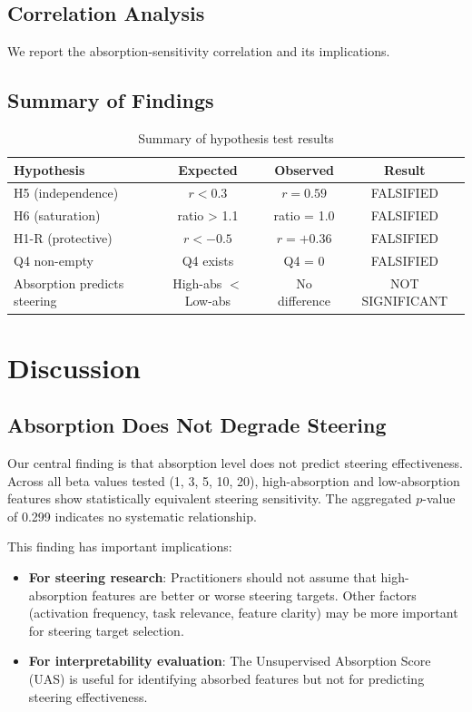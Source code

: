 \documentclass{article}
\begin{document}
\subsection{Correlation Analysis}

We report the absorption-sensitivity correlation and its implications.

\subsection{Summary of Findings}

\begin{table}[htbp]
\caption{Summary of hypothesis test results}
\label{tab:summary}
\centering
\begin{tabular}{lccc}
\toprule
Hypothesis & Expected & Observed & Result \\
\midrule
H5 (independence) & $r < 0.3$ & $r = 0.59$ & FALSIFIED \\
H6 (saturation) & ratio > 1.1 & ratio = 1.0 & FALSIFIED \\
H1-R (protective) & $r < -0.5$ & $r = +0.36$ & FALSIFIED \\
Q4 non-empty & Q4 exists & Q4 = 0 & FALSIFIED \\
Absorption predicts steering & High-abs $<$ Low-abs & No difference & NOT SIGNIFICANT \\
\bottomrule
\end{tabular}
\end{table}

\section{Discussion}

\subsection{Absorption Does Not Degrade Steering}

Our central finding is that absorption level does not predict steering effectiveness. Across all beta values tested (1, 3, 5, 10, 20), high-absorption and low-absorption features show statistically equivalent steering sensitivity. The aggregated $p$-value of 0.299 indicates no systematic relationship.

This finding has important implications:
\begin{itemize}
  \item \textbf{For steering research}: Practitioners should not assume that high-absorption features are better or worse steering targets. Other factors (activation frequency, task relevance, feature clarity) may be more important for steering target selection.
  \item \textbf{For interpretability evaluation}: The Unsupervised Absorption Score (UAS) is useful for identifying absorbed features but not for predicting steering effectiveness.
\end{itemize}
\end{document}
